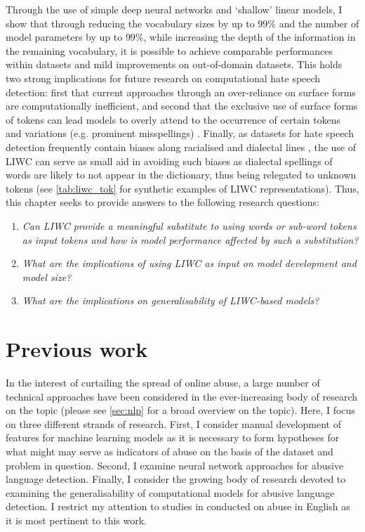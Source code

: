Through the use of simple deep neural networks and `shallow' linear models, I show that through reducing the vocabulary sizes by up to $99\%$ and the number of model parameters by up to $99\%$, while increasing the depth of the information in the remaining vocabulary, it is possible to achieve comparable performances within datasets and mild improvements on out-of-domain datasets. This holds two strong implications for future research on computational hate speech detection: first that current approaches through an over-reliance on surface forms are computationally inefficient, and second that the exclusive use of surface forms of tokens can lead models to overly attend to the occurrence of certain tokens and variations (e.g. prominent misspellings) \citep{Rottger:2021}. Finally, as datasets for hate speech detection frequently contain biases along racialised and dialectal lines \citep{Waseem:2018,Davidson:2019}, the use of LIWC can serve as small aid in avoiding such biases as dialectal spellings of words are likely to not appear in the dictionary, thus being relegated to unknown tokens (see \autoref{tab:liwc_tok} for synthetic examples of LIWC representations). Thus, this chapter seeks to provide answers to the following research questions:

\begin{minipage}{0.9\textwidth}
\vspace{5mm}
    \begin{enumerate}[start=1, label={\textbf{RQ \arabic*}}]
        \item{\textit{Can LIWC provide a meaningful substitute to using words or sub-word tokens as input tokens and how is model performance affected by such a substitution?}}
        \item{\textit{What are the implications of using LIWC as input on model development and model size?}}
        \item{\textit{What are the implications on generalisability of LIWC-based models?}}
    \end{enumerate}
\end{minipage}

\newpage
\section{Previous work}

In the interest of curtailing the spread of online abuse, a large number of technical approaches have been considered in the ever-increasing body of research on the topic (please see \autoref{sec:nlp} for a broad overview on the topic). Here, I focus on three different strands of research. First, I consider manual development of features for machine learning models as it is necessary to form hypotheses for what might may serve as indicators of abuse on the basis of the dataset and problem in question. Second, I examine neural network approaches for abusive language detection. Finally, I consider the growing body of research devoted to examining the generalisability of computational models for abusive language detection. I restrict my attention to studies in conducted on abuse in English as it is most pertinent to this work.

